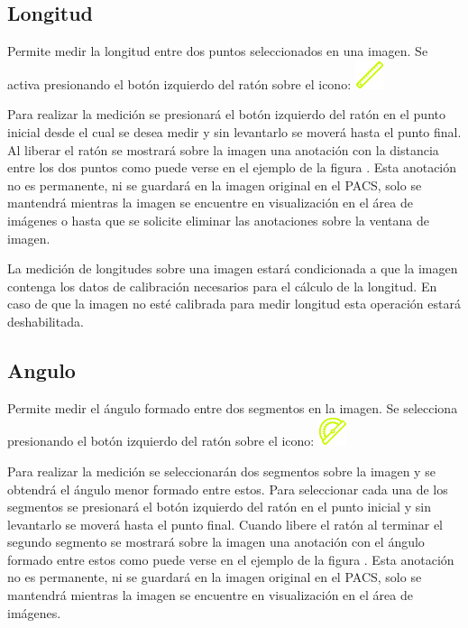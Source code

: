 \documentclass{plantilla-manual-usuario}
\begin{document}
\subsection{Longitud}\label{subsectionLongitudImagen}

Permite medir la longitud entre dos puntos seleccionados en una imagen. Se activa presionando el botón izquierdo del ratón sobre el icono: \includegraphics[scale=0.5]{images/distance.png}

Para realizar la medición se presionará el botón izquierdo del ratón en el punto inicial desde el cual se desea medir y sin levantarlo se moverá hasta el punto final. Al liberar el ratón se mostrará sobre la imagen una anotación con la distancia entre los dos puntos como puede verse en el ejemplo de la figura . Esta anotación no es permanente, ni se guardará en la imagen original en el PACS, solo se mantendrá mientras la imagen se encuentre en visualización en el área de imágenes o hasta que se solicite eliminar las anotaciones sobre la ventana de imagen.


La medición de longitudes sobre una imagen estará condicionada a que la imagen contenga los datos de calibración necesarios para el cálculo de la longitud. En caso de que la imagen no esté calibrada para medir longitud esta operación estará deshabilitada. 

\subsection{Angulo}\label{subsectionAnguloImagen}

Permite medir el ángulo formado entre dos segmentos en la imagen. Se selecciona presionando el botón izquierdo del ratón sobre el icono: \includegraphics[scale=0.5]{images/angle.png}

Para realizar la medición se seleccionarán dos segmentos sobre la imagen y se obtendrá el ángulo menor formado entre estos. Para seleccionar cada una de los segmentos se presionará el botón izquierdo del ratón en el punto inicial y sin levantarlo se moverá hasta el punto final. Cuando libere el ratón al terminar el segundo segmento se mostrará sobre la imagen una anotación con el ángulo formado entre estos como puede verse en el ejemplo de la figura . Esta anotación no es permanente, ni se guardará en la imagen original en el PACS, solo se mantendrá mientras la imagen se encuentre en visualización en el área de imágenes. 
\end{document}
